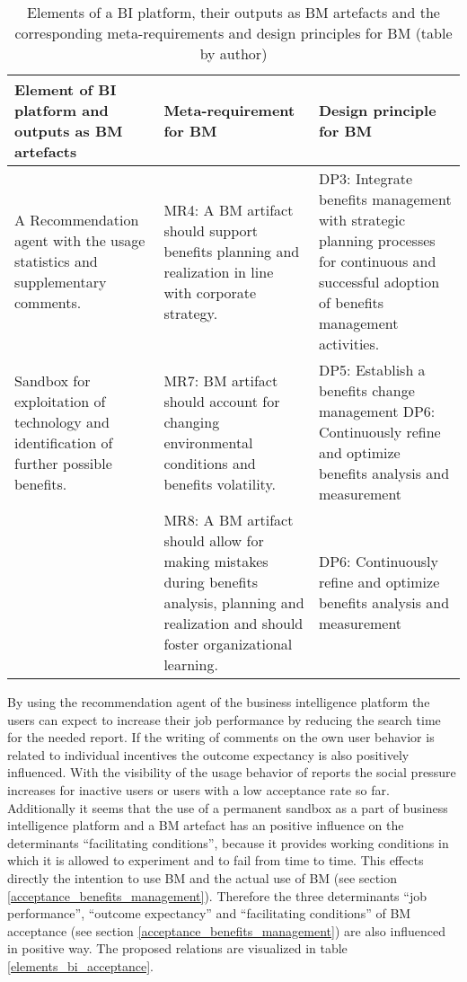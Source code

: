 \begin{table}[H]
  \begin{tabular}{|p{4.8cm}|p{4.8cm}|p{4.8cm}|}
 \hline
\textbf{Element of BI platform and outputs as BM artefacts} & \textbf{Meta-requirement for BM} & \textbf{Design principle for BM}\\
\hline  
A Recommendation agent with the usage statistics and supplementary comments.
&
MR4: A BM artifact should support benefits planning and realization in line with corporate strategy.
&
DP3: Integrate benefits management with strategic planning processes for continuous and successful adoption of benefits management activities.
\\
\hline

Sandbox for exploitation of technology and identification of further possible benefits.
&
MR7: BM artifact should account for changing environmental  conditions and benefits volatility.
&
DP5: Establish a benefits change management\newline
DP6: Continuously refine and optimize benefits analysis and measurement
\newline
\\
&
MR8: A BM artifact should allow for making mistakes during benefits analysis, planning and realization and should foster organizational learning. 
&
DP6: Continuously refine and optimize benefits analysis and measurement
\\
\hline
\end{tabular}
\caption{Elements of a BI platform, their outputs as BM artefacts and the corresponding meta-requirements and design principles for BM (table by author)}
\label{bi_elements_meta_requirement_bm}
\end{table}

By using the recommendation agent of the business intelligence platform the users can expect to increase their job performance by reducing the search time for the needed report. If the writing of comments on the own user behavior is related to individual incentives the outcome expectancy is also positively influenced. With the visibility of the usage behavior of reports the social pressure increases for inactive users or users with a low acceptance rate so far. Additionally it seems that the use of a permanent sandbox as a part of business intelligence platform and a BM artefact has an positive influence on the determinants ``facilitating conditions'', because it provides working conditions in which it is allowed to experiment and to fail from time to time. This effects directly the intention to use BM and the actual use of BM (see section \ref{acceptance_benefits_management}). Therefore the three determinants ``job performance'', ``outcome expectancy'' and ``facilitating conditions'' of BM acceptance (see section \ref{acceptance_benefits_management}) are also influenced in positive way. The proposed relations are visualized in table \ref{elements_bi_acceptance}.

